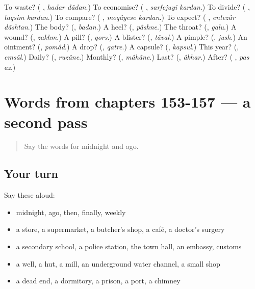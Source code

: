 \begin{tcolorbox}[breakable,colback=teal!4,colframe=teal!35!black,title={Before you move on}]
To waste? (\textbf{ }, \emph{hadar dâdan}.) To economise? (\textbf{  }, \emph{sarfejuyi kardan}.) To divide? (\textbf{ }, \emph{taqsim kardan}.) To compare? (\textbf{ }, \emph{moqâyese kardan}.) To expect? (\textbf{ }, \emph{entezâr dâshtan}.) The body? (\textbf{}, \emph{badan}.) A heel? (\textbf{}, \emph{pâshne}.) The throat? (\textbf{}, \emph{galu}.) A wound? (\textbf{}, \emph{zakhm}.) A pill? (\textbf{}, \emph{qors}.) A blister? (\textbf{}, \emph{tâval}.) A pimple? (\textbf{}, \emph{jush}.) An ointment? (\textbf{}, \emph{pomâd}.) A drop? (\textbf{}, \emph{qatre}.) A capsule? (\textbf{}, \emph{kapsul}.) This year? (\textbf{}, \emph{emsâl}.) Daily? (\textbf{}, \emph{ruzâne}.) Monthly? (\textbf{}, \emph{mâhâne}.) Last? (\textbf{}, \emph{âkhar}.) After? (\textbf{ }, \emph{pas az}.)
\end{tcolorbox}
\section[(dialogue)]{Words from chapters 153-157 — a second pass}

\label{lesson:FA-R157-second-pass-words-from-chapters-153-157}



\begin{quote}
Say the words for midnight and ago.
\end{quote}

\subsection*{Your turn}
Say these aloud:

\begin{itemize}
\raggedright
  \item midnight, ago, then, finally, weekly
  \item a store, a supermarket, a butcher's shop, a café, a doctor's surgery
  \item a secondary school, a police station, the town hall, an embassy, customs
  \item a well, a hut, a mill, an underground water channel, a small shop
  \item a dead end, a dormitory, a prison, a port, a chimney
\end{itemize}

